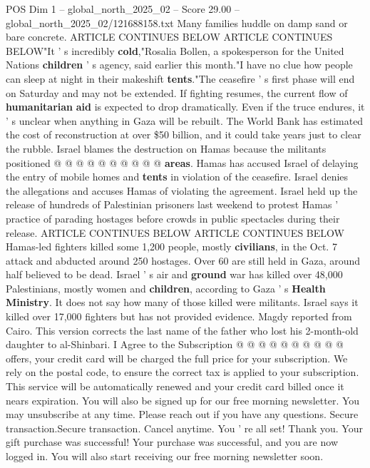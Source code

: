 \begin{textsample}{POS Dim 1 – global\_north\_2025\_02 – Score 29.00 – global\_north\_2025\_02/121688158.txt}
Many families huddle on damp sand or bare concrete.
ARTICLE CONTINUES BELOW ARTICLE CONTINUES BELOW"It ' s incredibly \textbf{cold},"Rosalia Bollen, a spokesperson for the United Nations \textbf{children} ' s agency, said earlier this month."I have no clue how people can sleep at night in their makeshift \textbf{tents}."The ceasefire ' s first phase will end on Saturday and may not be extended.
If fighting resumes, the current flow of \textbf{humanitarian} \textbf{aid} is expected to drop dramatically.
Even if the truce endures, it ' s unclear when anything in Gaza will be rebuilt.
The World Bank has estimated the cost of reconstruction at over \$50 billion, and it could take years just to clear the rubble.
Israel blames the destruction on Hamas because the militants positioned @ @ @ @ @ @ @ @ @ @ \textbf{areas}.
Hamas has accused Israel of delaying the entry of mobile homes and \textbf{tents} in violation of the ceasefire.
Israel denies the allegations and accuses Hamas of violating the agreement.
Israel held up the release of hundreds of Palestinian prisoners last weekend to protest Hamas ' practice of parading hostages before crowds in public spectacles during their release.
ARTICLE CONTINUES BELOW ARTICLE CONTINUES BELOW Hamas-led fighters killed some 1,200 people, mostly \textbf{civilians}, in the Oct. 7 attack and abducted around 250 hostages.
Over 60 are still held in Gaza, around half believed to be dead.
Israel ' s air and \textbf{ground} war has killed over 48,000 Palestinians, mostly women and \textbf{children}, according to Gaza ' s \textbf{Health} \textbf{Ministry}.
It does not say how many of those killed were militants.
Israel says it killed over 17,000 fighters but has not provided evidence.
Magdy reported from Cairo.
This version corrects the last name of the father who lost his 2-month-old daughter to al-Shinbari.
I Agree to the Subscription @ @ @ @ @ @ @ @ @ @ offers, your credit card will be charged the full price for your subscription.
We rely on the postal code, to ensure the correct tax is applied to your subscription.
This service will be automatically renewed and your credit card billed once it nears expiration.
You will also be signed up for our free morning newsletter.
You may unsubscribe at any time.
Please reach out if you have any questions.
Secure transaction.Secure transaction.
Cancel anytime.
You ' re all set!
Thank you.
Your gift purchase was successful!
Your purchase was successful, and you are now logged in.
You will also start receiving our free morning newsletter soon.

\end{textsample}
